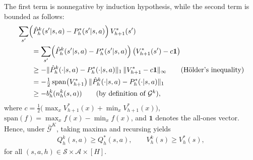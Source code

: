 \documentclass[11pt]{article}
\begin{document}
The first term is nonnegative by induction hypothesis, while the second term is bounded as follows:
\begin{align*}
    &\sum_{s'} \!\left(\hat P_h^k(s'|s,a) - P_h^*(s'|s,a)\right)V_{h+1}^*(s')\\
    &\qquad = \sum_{s'} \!\left(\hat P_h^k(s'|s,a) - P_h^*(s'|s,a)\right)
        \left(V_{h+1}^{*}(s') - c\mathbf{1}\right) \\
    &\qquad \ge -\|\hat P_h^k(\cdot|s,a) - P_h^*(\cdot|s,a)\|_1 
       \,\|V_{h+1}^{*} - c\mathbf{1}\|_\infty \tag{Hölder's inequality}\\
    &\qquad = -\tfrac{1}{2}\,\mathrm{span}\big(V_{h+1}^{*}\big)
       \,\|\hat P_h^k(\cdot|s,a) - P_h^*(\cdot|s,a)\|_1 \\
    &\qquad \ge -b_h^k(n_h^k(s,a))\tag{by definition of ${\mathcal{G}}^k$},
\end{align*}
where $c = \tfrac{1}{2}\big(\max_x V_{h+1}^{*}(x) + \min_x V_{h+1}^{*}(x)\big),$ $\mathrm{span}(f) = \max_x f(x) - \min_x f(x)$, and $\mathbf{1}$ denotes the all-ones vector. Hence, under $\bar{\mathcal{G}}^K$, taking maxima and recursing yields
\begin{align}    
    Q_h^k(s,a) \geq Q_h^*(s,a),
    \qquad 
    V_h^k(s)\ge V_h^*(s),\label{eq:good_event}
\end{align}
for all $(s,a,h)\in\mathcal{S}\times\mathcal{A}\times[H]$. 
\end{document}
